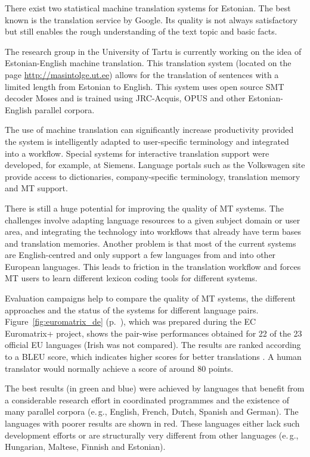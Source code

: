 \begin{multicols}{2}
There exist two statistical machine translation systems for Estonian. 
The best known is the translation service by Google. 
Its quality is not always satisfactory but still enables the rough understanding of the text topic and basic facts.

The research group in the University of Tartu is currently working on the idea of Estonian-English machine translation.  This translation system (located on the page \url{http://masintolge.ut.ee}) allows for the translation of sentences with a limited length from Estonian to English.  This system uses open source SMT decoder Moses and is trained using JRC-Acquis, OPUS and other Estonian-English parallel corpora.

The use of machine translation can significantly increase productivity provided the system is intelligently adapted to user-specific terminology and integrated into a workflow. 
Special systems for interactive translation support were developed, for example, at Siemens. 
Language portals such as the Volkswagen site provide access to dictionaries, company-specific terminology, translation memory and MT support. 

There is still a huge potential for improving the quality of MT systems. The challenges involve adapting language resources to a given subject domain or user area, and integrating the technology into workflows that already have term bases and translation memories. Another problem is that most of the current systems are English-centred and only support a few languages from and into other European languages. This leads to friction in the translation workflow and forces MT users to learn different lexicon coding tools for different systems.

Evaluation campaigns help to compare the quality of MT systems, the different approaches and the status of the systems for different language pairs. Figure~\ref{fig:euromatrix_de} (p.~\pageref{fig:euromatrix_de}), which was prepared during the EC Euromatrix+ project, shows the pair-wise performances obtained for 22 of the 23 official EU languages (Irish was not compared). The results are ranked according to a BLEU score, which indicates higher scores for better translations \cite{bleu1}. A human translator would normally achieve a score of around 80 points.

The best results (in green and blue) were achieved by languages that benefit from a considerable research effort in coordinated programmes and the existence of many parallel corpora (e.\,g., English, French, Dutch, Spanish and German). The languages with poorer results are shown in red. These languages either lack such development efforts or are structurally very different from other languages (e.\,g., Hungarian, Maltese, Finnish and Estonian).


\end{multicols}
